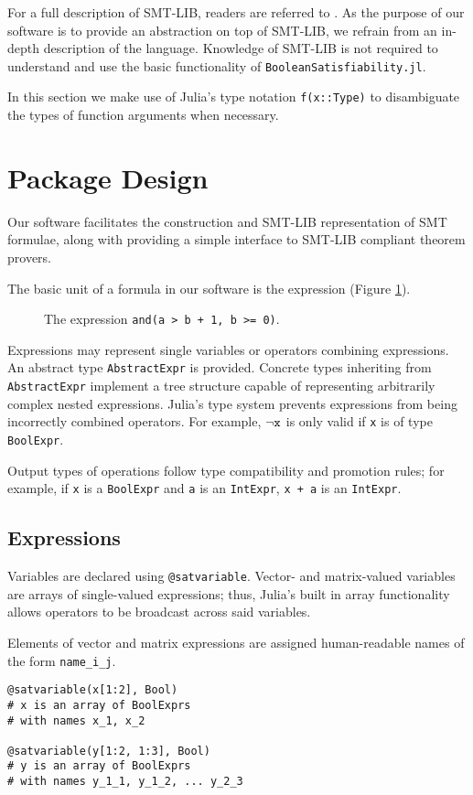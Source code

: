 \documentclass[conference]{IEEEtran}
\begin{document}
For a full description of SMT-LIB, readers are referred to \cite{smtlib2}. As the purpose of our software is to provide an abstraction on top of SMT-LIB, we refrain from an in-depth description of the language. Knowledge of SMT-LIB is not required to understand and use the basic functionality of \verb|BooleanSatisfiability.jl|.

In this section we make use of Julia's type notation \verb|f(x::Type)| to disambiguate the types of function arguments when necessary.

\section{Package Design}

Our software facilitates the construction and SMT-LIB representation of SMT formulae, along with providing a simple interface to SMT-LIB compliant theorem provers.

The basic unit of a formula in our software is the expression (Figure \ref{fig:expr-tree}).

\begin{figure}[h]
	\centering
	
	\caption{The expression \texttt{and(a > b + 1, b >= 0)}.}
	\label{fig:expr-tree}
\end{figure}

Expressions may represent single variables or operators combining expressions. An abstract type \verb|AbstractExpr| is provided. Concrete types inheriting from \verb|AbstractExpr| implement a tree structure capable of representing arbitrarily complex nested expressions. Julia's type system prevents expressions from being incorrectly combined operators. For example, $\neg\verb|x|$ is only valid if \verb|x| is of type \verb|BoolExpr|.

Output types of operations follow type compatibility and promotion rules; for example, if \verb|x| is a \verb|BoolExpr| and \verb|a| is an \verb|IntExpr|, \verb|x + a| is an \verb|IntExpr|.

\subsection{Expressions}
Variables are declared using \verb|@satvariable|. Vector- and matrix-valued variables are arrays of single-valued expressions; thus, Julia's built in array functionality allows operators to be broadcast across said variables.

Elements of vector and matrix expressions are assigned human-readable names of the form \verb|name_i_j|.
\begin{verbatim}
@satvariable(x[1:2], Bool)
# x is an array of BoolExprs
# with names x_1, x_2

@satvariable(y[1:2, 1:3], Bool)
# y is an array of BoolExprs
# with names y_1_1, y_1_2, ... y_2_3 
\end{verbatim}
\end{document}

